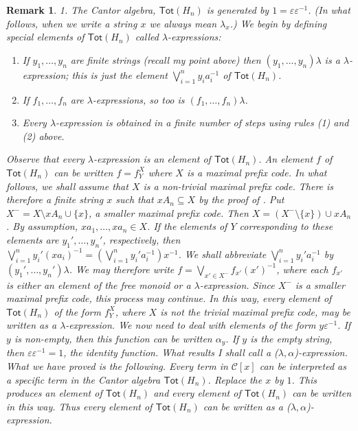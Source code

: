 \documentclass[a4paper]{amsart}
\newtheorem{remark}[theorem]{Remark}
\begin{document}
\begin{remark}
{1. {\em The Cantor algebra, $\mathsf{Tot}(H_{n})$ is generated by $1 = \varepsilon \varepsilon^{-1}$.}
(In what follows, when we write a string $x$ we always mean $\lambda_{x}$.)  
We begin by defining special elements of $\mathsf{Tot}(H_{n})$ called {\em $\lambda$-expressions}:
\begin{enumerate}
\item If $y_{1}, \ldots, y_{n}$ are finite strings (recall my point above) then $(y_{1}, \ldots, y_{n})\lambda$ is a $\lambda$-expression;
this is just the element $\bigvee_{i=1}^{n} y_{i}a_{i}^{-1}$ of $\mathsf{Tot}(H_{n})$.
\item If $f_{1}, \ldots, f_{n}$ are $\lambda$-expressions, so too is $(f_{1}, \ldots, f_{n})\lambda$. 
\item Every $\lambda$-expression is obtained in a finite number of steps using rules (1) and (2) above.
\end{enumerate} 
Observe that every $\lambda$-expression is an element of $\mathsf{Tot}(H_{n})$.
An element $f$ of $\mathsf{Tot}(H_{n})$ can be written $f = f^{X}_{Y}$ where $X$ is a maximal prefix code.
In what follows, we shall assume that $X$ is a non-trivial maximal prefix code. 
There is therefore a finite string $x$ such that $xA_{n} \subseteq X$ by the proof of  \cite[Theorem 3.4]{Lawson2021b}.
Put $X^{-} = X \setminus xA_{n} \cup \{x\}$, a smaller maximal prefix code.
Then $X = (X^{-} \setminus \{x\}) \cup xA_{n}$.
By assumption, $xa_{1}, \ldots, xa_{n} \in X$.
If the elements of $Y$ corresponding to these elements are $y_{1}', \ldots, y_{n}'$, respectively,
then $\bigvee_{i=1}^{n} y_{i}'(xa_{i})^{-1} = \left( \bigvee_{i=1}^{n} y_{i}'a_{i}^{-1} \right)x^{-1}$. 
We shall abbreviate $\bigvee_{i=1}^{n} y_{i}'a_{i}^{-1}$ by $(y_{1}', \ldots, y_{n}')\lambda$.
We may therefore write $f = \bigvee_{x' \in X^{-}} f_{x'}(x')^{-1}$,
where each $f_{x'}$ is either an element of the free monoid or a $\lambda$-expression.  
Since $X^{-}$ is a smaller maximal prefix code, this process may continue.
In this way, every element of $\mathsf{Tot}(H_{n})$ of the form $f^{X}_{Y}$, where $X$ is not the trivial maximal prefix code, may be written as a $\lambda$-expression.
We now need to deal with elements of the form $y\varepsilon^{-1}$.
If $y$ is non-empty, then this function can be written $\alpha_{y}$.
If $y$ is the empty string, then $\varepsilon \varepsilon^{-1} = 1$, the identity function.
What results I shall call a {\em ($\lambda,\alpha$)-expression}.
What we have proved is the following.
Every term in $\mathcal{C}[x]$ can be interpreted as a specific term in the Cantor algebra $\mathsf{Tot}(H_{n})$.
Replace the $x$ by $1$.
This produces an element of $\mathsf{Tot}(H_{n})$ and every element of $\mathsf{Tot}(H_{n})$
can be written in this way.
Thus every element of $\mathsf{Tot}(H_{n})$ can be written as a 
($\lambda,\alpha$)-expression.

}
\end{remark}
\end{document}

